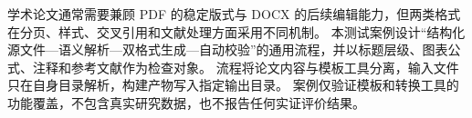 \begin{cnabstract}
学术论文通常需要兼顾 PDF 的稳定版式与 DOCX 的后续编辑能力，但两类格式在分页、样式、交叉引用和文献处理方面采用不同机制。
本测试案例设计“结构化源文件—语义解析—双格式生成—自动校验”的通用流程，并以标题层级、图表公式、注释和参考文献作为检查对象。
流程将论文内容与模板工具分离，输入文件只在自身目录解析，构建产物写入指定输出目录。
案例仅验证模板和转换工具的功能覆盖，不包含真实研究数据，也不报告任何实证评价结果。

\end{cnabstract}
